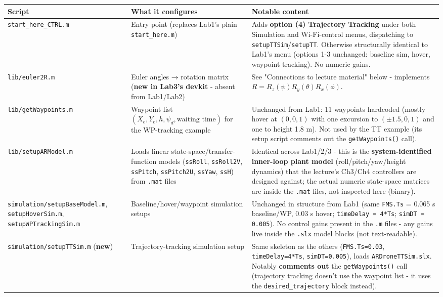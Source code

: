 \documentclass[11pt]{article}
\begin{document}
\begin{center}
\small
\setlength{\tabcolsep}{3pt}
\begin{longtable}{|p{3.0cm}|p{4.0cm}|p{7.2cm}|}
\hline
Script & What it configures & Notable content \\
\hline
\endhead
\texttt{start\_\allowbreak{}here\_\allowbreak{}CTRL.m} & Entry point (replaces Lab1's plain \texttt{start\_\allowbreak{}here.m}) & Adds \textbf{option (4) Trajectory Tracking} under both Simulation and Wi-Fi-control menus, dispatching to \texttt{setupTTSim}/\texttt{setupTT}. Otherwise structurally identical to Lab1's menu (options 1-3 unchanged: baseline sim, hover, waypoint tracking). No numeric gains. \\
\hline
\texttt{lib/\allowbreak{}euler2R.m} & Euler angles → rotation matrix (\textbf{new in Lab3's devkit} - absent from Lab1/Lab2) & See "Connections to lecture material" below - implements $R = R_z(\psi)R_y(\theta)R_x(\phi)$. \\
\hline
\texttt{lib/\allowbreak{}getWaypoints.m} & Waypoint list $(X_e, Y_e, h, \psi_d, \text{waiting time})$ for the WP-tracking example & Unchanged from Lab1: 11 waypoints hardcoded (mostly hover at $(0,0,1)$ with one excursion to $(\pm 1.5,0,1)$ and one to height 1.8 m). Not used by the TT example (its setup script comments out the \texttt{getWaypoints()} call). \\
\hline
\texttt{lib/\allowbreak{}setupARModel.m} & Loads linear state-space/transfer-function models (\texttt{ssRoll}, \texttt{ssRoll2V}, \texttt{ssPitch}, \texttt{ssPitch2U}, \texttt{ssYaw}, \texttt{ssH}) from \texttt{.mat} files & Identical across Lab1/2/3 - this is the \textbf{system-identified inner-loop plant model} (roll/pitch/yaw/height dynamics) that the lecture's Ch3/Ch4 controllers are designed against; the actual numeric state-space matrices are inside the \texttt{.mat} files, not inspected here (binary). \\
\hline
\texttt{simulation/\allowbreak{}setupBaseModel.m}, \texttt{setupHoverSim.m}, \texttt{setupWPTrackingSim.m} & Baseline/hover/waypoint simulation setups & Unchanged in structure from Lab1 (same \texttt{FMS.Ts} = 0.065 s baseline/WP, 0.03 s hover; \texttt{timeDelay = 4*Ts}; \texttt{simDT = 0.005}). No control gains present in the \texttt{.m} files - any gains live inside the \texttt{.slx} model blocks (not text-readable). \\
\hline
\texttt{simulation/\allowbreak{}setupTTSim.m} (\textbf{new}) & Trajectory-tracking simulation setup & Same skeleton as the others (\texttt{FMS.Ts=0.03}, \texttt{timeDelay=4*Ts}, \texttt{simDT=0.005}), loads \texttt{ARDroneTTSim.slx}. Notably \textbf{comments out} the \texttt{getWaypoints()} call (trajectory tracking doesn't use the waypoint list - it uses the \texttt{desired\_\allowbreak{}trajectory} block instead). \\

\end{longtable}
\end{center}
\end{document}
